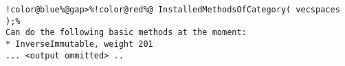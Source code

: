\begin{Verbatim}[commandchars=!@\%,frame=single]
!color@blue%@gap>%!color@red%@ InstalledMethodsOfCategory( vecspaces );%
Can do the following basic methods at the moment:
* InverseImmutable, weight 201
... <output ommitted> ..
\end{Verbatim}
